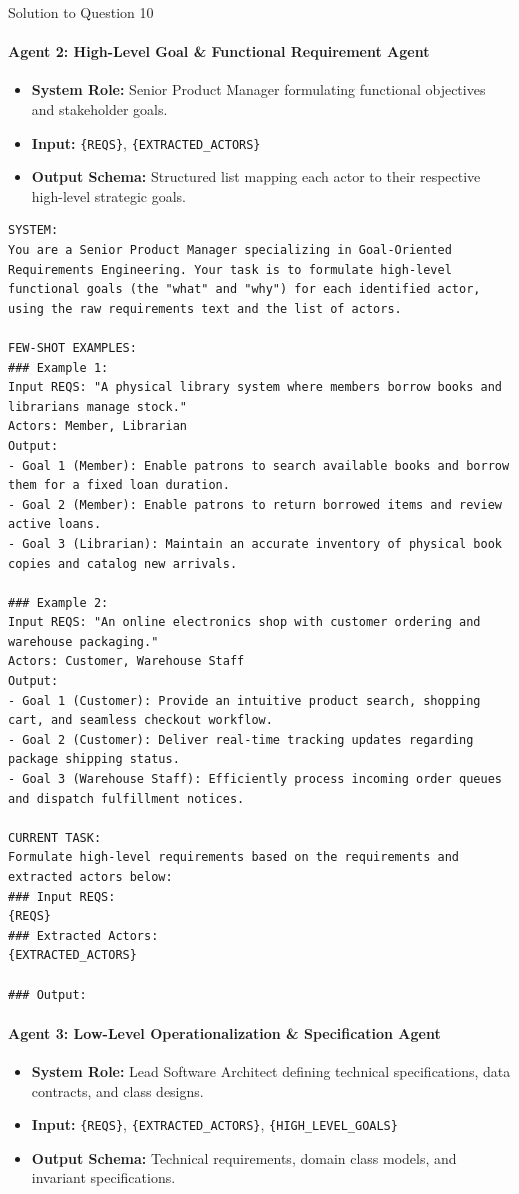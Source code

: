 \documentclass[11pt,a4paper]{article}
\begin{document}
\begin{solutionbox}{Solution to Question 10}
\paragraph{Agent 2: High-Level Goal \& Functional Requirement Agent}
\begin{itemize}
    \item \textbf{System Role:} Senior Product Manager formulating functional objectives and stakeholder goals.
    \item \textbf{Input:} \texttt{\{REQS\}}, \texttt{\{EXTRACTED\_ACTORS\}}
    \item \textbf{Output Schema:} Structured list mapping each actor to their respective high-level strategic goals.
\end{itemize}

\begin{lstlisting}
SYSTEM:
You are a Senior Product Manager specializing in Goal-Oriented Requirements Engineering. Your task is to formulate high-level functional goals (the "what" and "why") for each identified actor, using the raw requirements text and the list of actors.

FEW-SHOT EXAMPLES:
### Example 1:
Input REQS: "A physical library system where members borrow books and librarians manage stock."
Actors: Member, Librarian
Output:
- Goal 1 (Member): Enable patrons to search available books and borrow them for a fixed loan duration.
- Goal 2 (Member): Enable patrons to return borrowed items and review active loans.
- Goal 3 (Librarian): Maintain an accurate inventory of physical book copies and catalog new arrivals.

### Example 2:
Input REQS: "An online electronics shop with customer ordering and warehouse packaging."
Actors: Customer, Warehouse Staff
Output:
- Goal 1 (Customer): Provide an intuitive product search, shopping cart, and seamless checkout workflow.
- Goal 2 (Customer): Deliver real-time tracking updates regarding package shipping status.
- Goal 3 (Warehouse Staff): Efficiently process incoming order queues and dispatch fulfillment notices.

CURRENT TASK:
Formulate high-level requirements based on the requirements and extracted actors below:
### Input REQS:
{REQS}
### Extracted Actors:
{EXTRACTED_ACTORS}

### Output:
\end{lstlisting}

\paragraph{Agent 3: Low-Level Operationalization \& Specification Agent}
\begin{itemize}
    \item \textbf{System Role:} Lead Software Architect defining technical specifications, data contracts, and class designs.
    \item \textbf{Input:} \texttt{\{REQS\}}, \texttt{\{EXTRACTED\_ACTORS\}}, \texttt{\{HIGH\_LEVEL\_GOALS\}}
    \item \textbf{Output Schema:} Technical requirements, domain class models, and invariant specifications.
\end{itemize}


\end{solutionbox}
\end{document}
